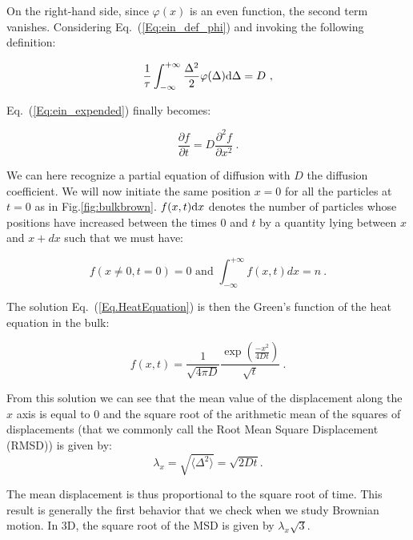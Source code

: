 On the right-hand side, since $\varphi(x)$ is an even function, the second term vanishes. Considering Eq.~(\ref{Eq:ein_def_phi}) and invoking the following definition:



\begin{equation}
	\frac{1}{\tau} \int_{-\infty}^{+\infty} \frac{\Delta^2}{2}\varphi(\Delta)\textnormal{d}\Delta = D ~,
\end{equation}

Eq.~(\ref{Eq:ein_expended}) finally becomes:

\begin{equation}
	\frac{\partial f}{\partial t} = D \frac{\partial ^2 f}{\partial x ^2} ~.
	\label{Eq.HeatEquation}
\end{equation}


We can here recognize a partial equation of diffusion with $D$ the diffusion coefficient. We will now initiate the same position $x=0$ for all the particles at $t=0$ as in Fig.\ref{fig:bulkbrown}. $f(x,t)\textnormal{d}x$ denotes the number of particles whose positions have increased between the times  $0$ and $t$  by a quantity lying between $x$ and $x + dx$ such that we must have:

\begin{equation}
	f(x \ne 0, t=0) = 0 \text{ and } \int_{-\infty}^{+\infty}f(x,t)dx = n ~.
\end{equation}

The solution Eq.~(\ref{Eq.HeatEquation}) is then the Green's function of the heat equation in the bulk:


\begin{equation}
f(x,t) = \frac{1}{\sqrt{4\pi D}} \frac{\exp \left(\frac{-x^2}{4Dt} \right)}{\sqrt{t}} ~.
\end{equation}

From this solution we can see that the mean value of the displacement along the $x$ axis is equal to $0$ and the square root of the arithmetic mean of the squares of displacements (that we commonly call the Root Mean Square Displacement (R\gls{MSD}))  is given by:
\begin{equation}
	\lambda _x = \sqrt{\langle \Delta ^2 \rangle} =  \sqrt{2Dt}.
	\label{Eq:MSD_ein}
\end{equation}

The mean displacement is thus proportional to the square root of time. This result is generally the first behavior that we check when we study Brownian motion. In 3D, the square root of the \gls{MSD} is given by $\lambda_x \sqrt{3}$.

